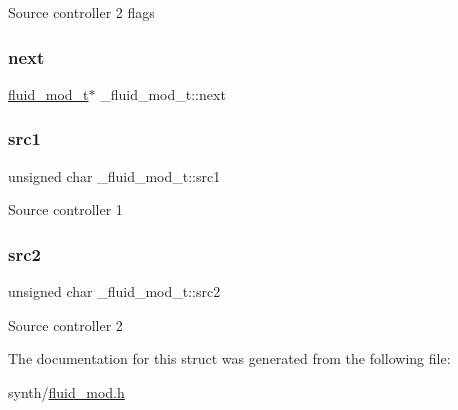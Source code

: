 Source controller 2 flags \mbox{\label{struct__fluid__mod__t_a596143c498657350b1d43cb99a2bc6b0}} 
\subsubsection{\texorpdfstring{next}{next}}
{\footnotesize\ttfamily \hyperlink{types_8h_a6c727efab500d6c0c350d4292e9aa5ef}{fluid\+\_\+mod\+\_\+t}$\ast$ \+\_\+fluid\+\_\+mod\+\_\+t\+::next}

\mbox{\label{struct__fluid__mod__t_a199e73690c3e5fdb0e073d05f8237196}} 
\subsubsection{\texorpdfstring{src1}{src1}}
{\footnotesize\ttfamily unsigned char \+\_\+fluid\+\_\+mod\+\_\+t\+::src1}

Source controller 1 \mbox{\label{struct__fluid__mod__t_a8f83acd72515a3dc6d6d73089b907685}} 
\subsubsection{\texorpdfstring{src2}{src2}}
{\footnotesize\ttfamily unsigned char \+\_\+fluid\+\_\+mod\+\_\+t\+::src2}

Source controller 2 

The documentation for this struct was generated from the following file\+:\begin{DoxyCompactItemize}
\item 
synth/\hyperlink{fluid__mod_8h}{fluid\+\_\+mod.\+h}\end{DoxyCompactItemize}
